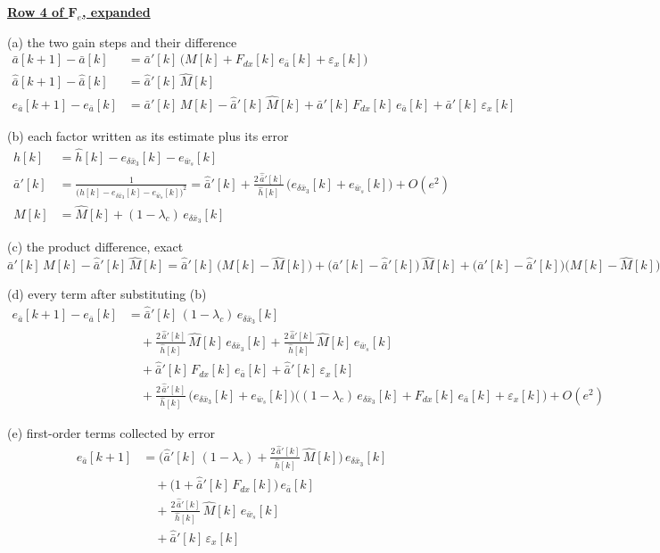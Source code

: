 \documentclass[11pt,a4paper]{ctexart}
\newcommand{\lc}{\lambda_c}
\newcommand{\bx}{\bar{x}}
\newcommand{\ba}{\bar{a}}
\newcommand{\bw}{\bar{w}}
\newcommand{\hh}{\hat{h}}
\newcommand{\hd}[1]{\par\bigskip\noindent\underline{\textbf{#1}}}
\begin{document}
\clearpage
\hd{Row 4 of $\mathbf{F}_e$, expanded}

\noindent (a) the two gain steps and their difference
\[
\begin{aligned}
\ba[k+1] - \ba[k] &= \ba'[k]\,\big(M[k] + F_{dx}[k]\,e_{\ba}[k] + \varepsilon_x[k]\big) \\
\hat{\ba}[k+1] - \hat{\ba}[k] &= \hat{\ba}'[k]\,\hat{M}[k] \\
e_{\ba}[k+1] - e_{\ba}[k] &= \ba'[k]\,M[k] - \hat{\ba}'[k]\,\hat{M}[k] + \ba'[k]\,F_{dx}[k]\,e_{\ba}[k] + \ba'[k]\,\varepsilon_x[k]
\end{aligned}
\]

\noindent (b) each factor written as its estimate plus its error
\[
\begin{aligned}
h[k] &= \hh[k] - e_{\delta\bx_3}[k] - e_{\bw_s}[k] \\
\ba'[k] &= \frac{1}{\big(\hh[k] - e_{\delta\bx_3}[k] - e_{\bw_s}[k]\big)^{2}}
= \hat{\ba}'[k] + \frac{2\,\hat{\ba}'[k]}{\hh[k]}\,\big(e_{\delta\bx_3}[k] + e_{\bw_s}[k]\big) + O(e^{2}) \\
M[k] &= \hat{M}[k] + (1-\lc)\,e_{\delta\bx_3}[k]
\end{aligned}
\]

\noindent (c) the product difference, exact
\[
\ba'[k]\,M[k] - \hat{\ba}'[k]\,\hat{M}[k]
= \hat{\ba}'[k]\,\big(M[k] - \hat{M}[k]\big) + \big(\ba'[k] - \hat{\ba}'[k]\big)\,\hat{M}[k] + \big(\ba'[k] - \hat{\ba}'[k]\big)\big(M[k] - \hat{M}[k]\big)
\]

\noindent (d) every term after substituting (b)
\[
\begin{aligned}
e_{\ba}[k+1] - e_{\ba}[k]
&= \hat{\ba}'[k]\,(1-\lc)\,e_{\delta\bx_3}[k] \\
&\quad + \frac{2\,\hat{\ba}'[k]}{\hh[k]}\,\hat{M}[k]\,e_{\delta\bx_3}[k] + \frac{2\,\hat{\ba}'[k]}{\hh[k]}\,\hat{M}[k]\,e_{\bw_s}[k] \\
&\quad + \hat{\ba}'[k]\,F_{dx}[k]\,e_{\ba}[k] + \hat{\ba}'[k]\,\varepsilon_x[k] \\
&\quad + \frac{2\,\hat{\ba}'[k]}{\hh[k]}\,\big(e_{\delta\bx_3}[k] + e_{\bw_s}[k]\big)\Big((1-\lc)\,e_{\delta\bx_3}[k] + F_{dx}[k]\,e_{\ba}[k] + \varepsilon_x[k]\Big) + O(e^{2})
\end{aligned}
\]

\noindent (e) first-order terms collected by error
\[
\begin{aligned}
e_{\ba}[k+1] &= \Big(\hat{\ba}'[k]\,(1-\lc) + \frac{2\,\hat{\ba}'[k]}{\hh[k]}\,\hat{M}[k]\Big)\,e_{\delta\bx_3}[k] \\
&\quad + \big(1 + \hat{\ba}'[k]\,F_{dx}[k]\big)\,e_{\ba}[k] \\
&\quad + \frac{2\,\hat{\ba}'[k]}{\hh[k]}\,\hat{M}[k]\,e_{\bw_s}[k] \\
&\quad + \hat{\ba}'[k]\,\varepsilon_x[k]
\end{aligned}
\]
\end{document}
